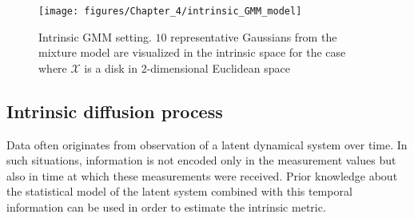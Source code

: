 \begin{figure}[h]
	\begin{centering}
		\texttt{[image: figures/Chapter\_4/intrinsic\_GMM\_model]}
	\end{centering}
	\caption[Intrinsic \ac{GMM} setting]{Intrinsic \ac{GMM} setting. $10$ representative Gaussians from the mixture model are visualized in the intrinsic space for the case where $\mathcal{X}$ is a disk in 2-dimensional Euclidean space \label{fig:Intrinsic-Gmm-setting}}
\end{figure}

\subsection{Intrinsic diffusion process\label{ssec:Intrinsic-diffusion-processes}}

Data often originates from observation of a latent dynamical system over time. In such situations, information is not encoded only in the measurement values but also in time at which these measurements were received. Prior knowledge about the statistical model of the latent system combined with this temporal information can be used in order to estimate the intrinsic metric. 

